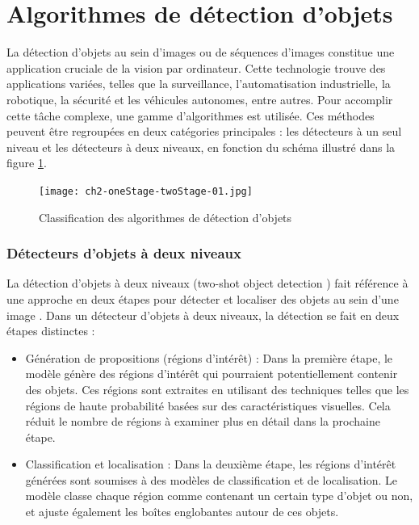 \section{Algorithmes de détection d'objets}

La détection d'objets au sein d'images ou de séquences d'images constitue une application cruciale de la vision par ordinateur. Cette technologie trouve des applications variées, telles que la surveillance, l'automatisation industrielle, la robotique, la sécurité et les véhicules autonomes, entre autres. Pour accomplir cette tâche complexe, une gamme d'algorithmes est utilisée. Ces méthodes peuvent être regroupées en deux catégories principales : les détecteurs à un seul niveau et les détecteurs à deux niveaux, en fonction du schéma illustré dans la figure \ref{ch2-oneStage-twoStage-01}.

\begin{figure}[H]
	\centering
	\texttt{[image: ch2-oneStage-twoStage-01.jpg]}
	\caption{Classification des algorithmes de détection d'objets }
 \label{ch2-oneStage-twoStage-01}
\end{figure}

\subsubsection{Détecteurs d'objets à deux niveaux}
La  détection d'objets à deux niveaux (two-shot object detection ) fait référence à une approche en deux étapes pour détecter et localiser des objets au sein d'une image \cite{ch2_The5Comp69}.
Dans un détecteur d'objets à deux niveaux, la détection se fait en deux étapes distinctes :
\begin{itemize}
    \item [(1)] Génération de propositions (régions d'intérêt) : Dans la première étape, le modèle génère des régions d'intérêt qui pourraient potentiellement contenir des objets. Ces régions sont extraites en utilisant des techniques telles que les régions de haute probabilité basées sur des caractéristiques visuelles. Cela réduit le nombre de régions à examiner plus en détail dans la prochaine étape.
    \item [(2)] Classification et localisation : Dans la deuxième étape, les régions d'intérêt générées sont soumises à des modèles de classification et de localisation. Le modèle classe chaque région comme contenant un certain type d'objet ou non, et ajuste également les boîtes englobantes autour de ces objets.
\end{itemize}

